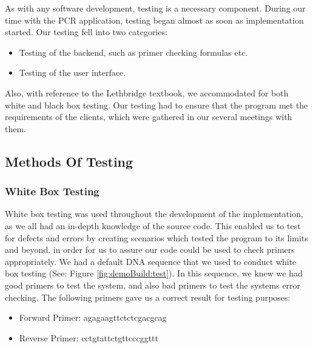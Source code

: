 %
%

As with any software development, testing is a necessary component. During our time with the PCR application, testing began
almost as soon as implementation started. Our testing fell into two categories:

\begin{itemize}
\item Testing of the backend, such as primer checking formulas etc.
\item Testing of the user interface.
\end{itemize}

Also, with reference to the Lethbridge textbook\cite{Lethbridge}, we
accommodated for both white and black box testing. Our testing had to
ensure that the program met the requirements of the clients, which
were gathered in our several meetings with them.

\subsection{Methods Of Testing}
\subsubsection{White Box Testing}
White box testing was used throughout the development of the
implementation, as we all had an in-depth knowledge of the source
code. 
This enabled us to test for defects and errors by creating
scenarios which tested the program to its limits and beyond, in order
for us to assure our code could be used to check primers
appropriately. 
We had a default DNA sequence that we used to conduct white box
testing (See: Figure \ref{fig:demoBuild:test}).
In this sequence, we knew we had good primers to test the system, and
also bad primers to test the systems error checking. The following primers
gave us a correct result for testing purposes:

\begin{itemize}
\item Forward Primer: agagaagttctctcgacgcag
\item Reverse Primer: cctgtattctgttcccggttt
\end{itemize}

